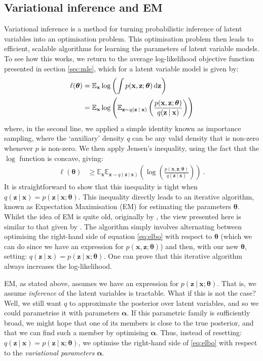 \documentclass[11pt, oneside]{article}
\newcommand{\thetab}{{\boldsymbol{\theta}}}
\newcommand{\alphab}{{\boldsymbol{\alpha}}}
\newcommand{\pnorm}{p}
\newcommand{\q}[1]{q(\z \given{#1})}
\newcommand{\x}{{\mathbf x}}
\newcommand{\z}{{\mathbf z}}
\newcommand{\E}{\mathbb{E}}
\newcommand{\Ex}{\E_{\x}}
\newcommand{\Evar}[1]{\E_{\z \sim \q{#1}}}
\newcommand\given[1][]{\:#1\vert\:}
\theoremstyle{definition}
\begin{document}
\subsection{Variational inference and EM}
Variational inference \citep{jordan1999introduction} is a method for turning probabilistic inference of latent variables into an optimisation problem. This optimisation problem then leads to efficient, scalable algorithms for learning the parameters of latent variable models. To see how this works, we return to the average log-likelihood objective function presented in section \ref{sec:mle}, which for a latent variable model is given by:
\begin{align}
    \ell(\thetab) &= \Ex  \log \left( \int \pnorm(\x, \z;\thetab) \dif \z  \right)  \\
                  &= \Ex \log \left( \Evar{\x} \left( \frac{\pnorm(\x, \z;\thetab)}{\q{\x}} \right)  \right)
\end{align}
where, in the second line, we applied a simple identity known as importance sampling, where the `auxiliary' density $q$ can be any valid density that is non-zero whenever $\pnorm$ is non-zero. We then apply Jensen's inequality, using the fact that the $\log$ function is concave, giving:
\begin{align}
    \ell(\thetab) &\geq \Ex \Evar{\x} \left( \log \left( \frac{\pnorm(\x, \z;\thetab)}{\q{\x}} \right) \right) \ .
    \label{eq:elbo}
\end{align}
It is straightforward to show that this inequality is tight when $\q{\x} = \pnorm(\z \given \x; \thetab)$. This inequality directly leads to an iterative algorithm, known as Expectation Maximisation (EM) for estimating the parameters $\thetab$. Whilst the idea of EM is quite old, originally by \citet{dempster1977maximum}, the view presented here is similar to that given by \citet{neal1998view}. The algorithm simply involves alternating between optimising the right-hand side of equation \ref{eq:elbo} with respect to $\thetab$ (which we can do since we have an expression for $\pnorm(\x, \z;\thetab)$) and then, with our new $\thetab$, setting: $\q{\x} = \pnorm(\z \given \x; \thetab)$. One can prove that this iterative algorithm always increases the log-likelihood.

EM, as stated above, assumes we have an expression for $\pnorm(\z \given \x; \thetab)$. That is, we assume \emph{inference} of the latent variables is tractable. What if this is not the case? Well, we still want $q$ to approximate the posterior over latent variables, and so we could parametrise it with parameters $\alphab$. If this parametric family is sufficiently broad, we might hope that one of its members is close to the true posterior, and that we can find such a member by optimising $\alphab$. Thus, instead of resetting: $\q{\x} = \pnorm(\z \given \x; \thetab)$, we optimise the right-hand side of \ref{eq:elbo} with respect to the \emph{variational parameters} $\alphab$.
\end{document}
